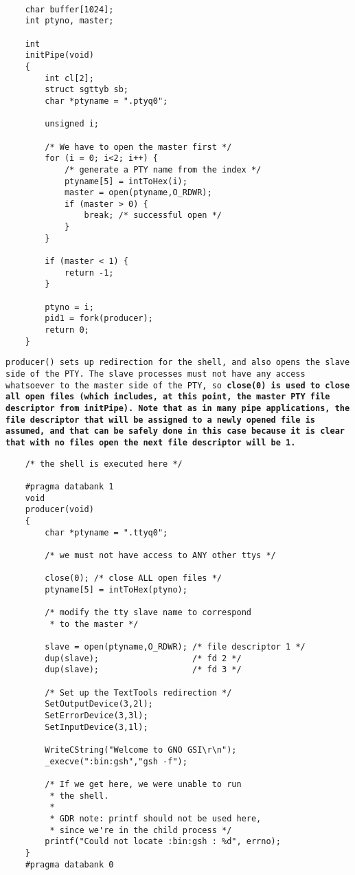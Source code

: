 \documentclass{report}
\begin{document}
\begin{verbatim}

    char buffer[1024];
    int ptyno, master;
    
    int 
    initPipe(void)
    {
        int cl[2];
        struct sgttyb sb;
        char *ptyname = ".ptyq0";
    
        unsigned i;
    
        /* We have to open the master first */
        for (i = 0; i<2; i++) {
            /* generate a PTY name from the index */
            ptyname[5] = intToHex(i);
            master = open(ptyname,O_RDWR);
            if (master > 0) {
                break; /* successful open */
            }
        }
    
        if (master < 1) {
            return -1;
        }
    
        ptyno = i;
        pid1 = fork(producer);
        return 0;
    }
\end{verbatim}

\tt producer() \rm
sets up redirection for the shell, and also opens
the slave side of the PTY. The slave processes must not have any
access whatsoever to the master side of the PTY, so \bf close(0) \rm
is used to close all open files (which includes, at this point,
the master PTY file descriptor from initPipe). Note that as in
many pipe applications, the file descriptor that will be assigned
to a newly opened file is assumed, and that can be safely done in
this case because it is clear that with no files open the next
file descriptor will be 1.

\begin{verbatim}
    /* the shell is executed here */
    
    #pragma databank 1
    void 
    producer(void)
    {
        char *ptyname = ".ttyq0";
    
        /* we must not have access to ANY other ttys */

        close(0); /* close ALL open files */
        ptyname[5] = intToHex(ptyno); 

        /* modify the tty slave name to correspond
         * to the master */

        slave = open(ptyname,O_RDWR); /* file descriptor 1 */
        dup(slave);                   /* fd 2 */
        dup(slave);                   /* fd 3 */

        /* Set up the TextTools redirection */
        SetOutputDevice(3,2l);
        SetErrorDevice(3,3l);
        SetInputDevice(3,1l);

        WriteCString("Welcome to GNO GSI\r\n");
        _execve(":bin:gsh","gsh -f");

        /* If we get here, we were unable to run 
         * the shell.
         *
         * GDR note: printf should not be used here,
         * since we're in the child process */
        printf("Could not locate :bin:gsh : %d", errno);
    }
    #pragma databank 0
\end{verbatim}
\end{document}
